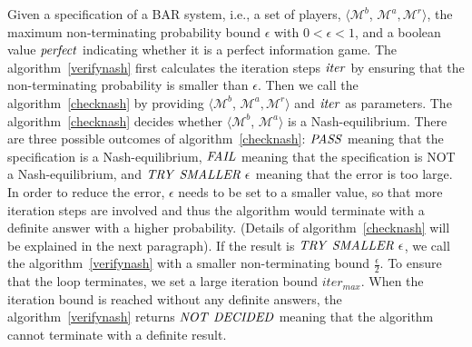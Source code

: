 Given a specification of a BAR system, i.e., a set of players, $\langle \mathcal{M}^b$, $\mathcal{M}^a, \mathcal{M}^r \rangle$, the maximum non-terminating probability bound $\epsilon$ with $0 < \epsilon < 1$, and a boolean value $\mathit{perfect}$ indicating whether it is a perfect information game. The algorithm~\ref{verifynash} first calculates the iteration steps $\mathit{iter}$ by ensuring that the non-terminating probability is smaller than $\epsilon$. Then we call the algorithm~\ref{checknash} by providing $\langle \mathcal{M}^b$, $\mathcal{M}^a, \mathcal{M}^r \rangle$ and $\mathit{iter}$ as parameters. The algorithm~\ref{checknash} decides whether $\langle \mathcal{M}^b$, $\mathcal{M}^a \rangle$ is a Nash-equilibrium. There are three possible outcomes of algorithm~\ref{checknash}: $\mathit{PASS}$ meaning that the specification is a Nash-equilibrium, $\mathit{FAIL}$ meaning that the specification is NOT a Nash-equilibrium, and $\mathit{TRY}\ \mathit{SMALLER}\ \epsilon$ meaning that the error is too large. In order to reduce the error, $\epsilon$ needs to be set to a smaller value, so that more iteration steps are involved and thus the algorithm would terminate with a definite answer with a higher probability. (Details of algorithm~\ref{checknash} will be explained in the next paragraph). If the result is $\mathit{TRY}\ \mathit{SMALLER}\ \epsilon$, we call the algorithm~\ref{verifynash} with a smaller non-terminating bound $\frac{\epsilon}{2}$. To ensure that the loop terminates, we set a large iteration bound $iter_{max}$. When the iteration bound is reached without any definite answers, the algorithm~\ref{verifynash} returns $\mathit{NOT}\ \mathit{DECIDED}$ meaning that the algorithm cannot terminate with a definite result.

 

